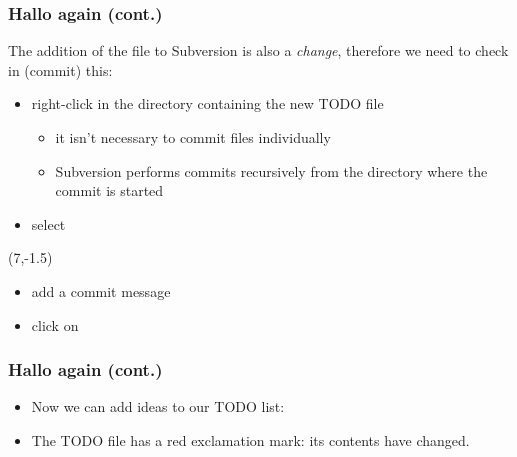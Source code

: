 \begin{frame}[fragile]
    \frametitle{Hallo again (cont.)}

    The addition of the file to Subversion is also a \emph{change},
    therefore we need to check in (commit) this:
    \begin{itemize}
        \item right-click in the directory containing the new TODO file
            \begin{itemize}
                \item it isn't necessary to commit files individually
                \item Subversion performs commits recursively from the
                    directory where the commit is started
            \end{itemize}
        \item select 
    \end{itemize}

    \begin{textblock}{0}(7,-1.5)
    \end{textblock}

    \begin{itemize}
        \item add a commit message
        \item click on 
    \end{itemize}
\end{frame}

\begin{frame}[fragile]
    \frametitle{Hallo again (cont.)}

    \begin{itemize}
        \item Now we can add ideas to our TODO list:
    \end{itemize}
    \begin{center}
    \end{center}

    \begin{itemize}
        \item The TODO file has a red exclamation mark: its contents have changed.
    \end{itemize}
    \begin{center}
    \end{center}
\end{frame}

